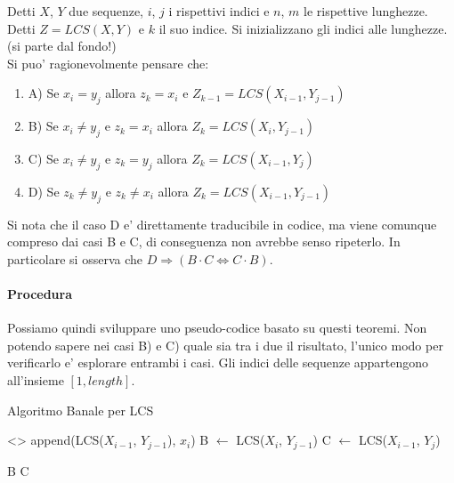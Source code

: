 Detti $X$, $Y$ due sequenze, $i$, $j$ i rispettivi indici e $n$, $m$ le rispettive lunghezze.
Detti $Z = LCS(X, Y)$ e $k$ il suo indice. Si inizializzano gli indici alle lunghezze. (si parte dal fondo!) \\

Si puo' ragionevolmente pensare che:

\begin{enumerate}

\item A) Se $x_{i} = y_{j}$ allora $z_{k} = x_{i}$ e $Z_{k-1} = LCS(X_{i-1}, Y_{j-1})$

\item B) Se $x_{i} \ne y_{j}$ e $z_{k} = x_{i}$ allora $Z_{k}= LCS(X_{i}, Y_{j-1})$

\item C) Se $x_{i} \ne y_{j}$ e $z_{k} = y_{j}$ allora $Z_{k}= LCS(X_{i-1}, Y_{j})$

\item D) Se $z_{k} \ne y_{j}$ e $z_{k} \ne x_{i}$ allora $Z_{k} = LCS(X_{i-1}, Y_{j-1})$

\end{enumerate}

Si nota che il caso D e' direttamente traducibile in codice, ma viene comunque compreso dai casi B e C, di conseguenza non avrebbe senso ripeterlo.
In particolare si osserva che $D \Rightarrow (B \cdot C \Leftrightarrow C \cdot B)$.

\paragraph{Procedura}

Possiamo quindi sviluppare uno pseudo-codice basato su questi teoremi.
Non potendo sapere nei casi B) e C) quale sia tra i due il risultato, l'unico modo per verificarlo e' esplorare entrambi i casi.
Gli indici delle sequenze appartengono all'insieme $[1, length]$.

\begin{algorithm}
    \renewcommand\thealgorithm{}
    \caption{Algoritmo Banale per LCS}
    \begin{algorithmic}
                \State \Return <>
            \Else
                    \State \Return append(LCS($X_{i-1}$, $Y_{j-1}$), $x_{i}$)
                \Else
                    \State B $\gets$ LCS($X_{i}$, $Y_{j-1}$)
                    \State C $\gets$ LCS($X_{i-1}$, $Y_{j}$)

                        \State \Return B
                    \Else
                        \State \Return C
                    \EndIf
                \EndIf
            \EndIf
        \EndProcedure
    \end{algorithmic}
\end{algorithm}

